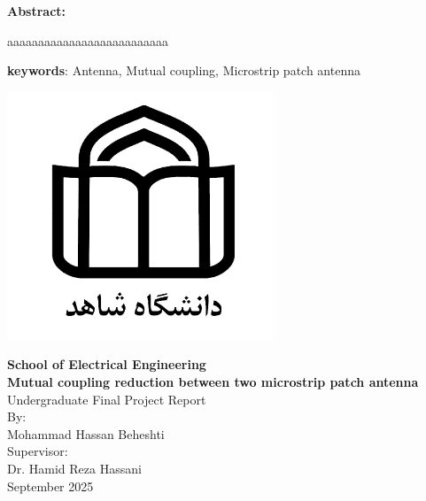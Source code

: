 \newpage
\thispagestyle{empty}
\begin{latin}
\textbf{Abstract:}

aaaaaaaaaaaaaaaaaaaaaaaaaa


\textbf{keywords}: 
Antenna, Mutual coupling, Microstrip patch antenna
\end{latin}
\newpage
\thispagestyle{empty}
\vspace*{-28mm}

\centerline{\includegraphics[scale=0.5]{./Images/general/logo_en.png}}
\begin{latin}
\begin{center}
\large
\vspace{-1mm}
\textbf{School of Electrical Engineering}
\\[3cm]
\textbf{Mutual coupling reduction between two microstrip patch antenna}
\\[1.5cm]
Undergraduate Final Project Report
\\[4cm]
By: 
\\[0.5cm]
Mohammad Hassan Beheshti
\\[1cm]
Supervisor:
\\[0.5cm]
Dr. Hamid Reza Hassani
\\[2cm]
September 2025

\end{center}
\end{latin}
